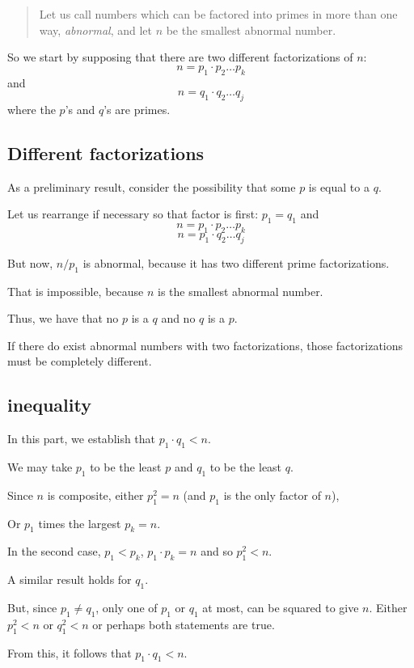 \documentclass[11pt, oneside]{article}
\begin{document}
\begin{quote}Let us call numbers which can be factored into primes in more than one way, \emph{abnormal}, and let $n$ be the smallest abnormal number.\end{quote}

So we start by supposing that there are two different factorizations of $n$:
\[ n = p_1 \cdot p_2 \dots p_k \]
and
\[ n = q_1 \cdot q_2 \dots q_j \]
where the $p$'s and $q$'s are primes.

\subsection*{Different factorizations}

As a preliminary result, consider the possibility that some $p$ is equal to a $q$.

Let us rearrange if necessary so that factor is first:  $p_1 = q_1$ and
\[ n = p_1 \cdot p_2 \dots p_k \]
\[ n = p_1 \cdot q_2 \dots q_j \]

But now, $n/p_1$ is abnormal, because it has two different prime factorizations.  

That is impossible, because $n$ is the smallest abnormal number.

Thus, we have that no $p$ is a $q$ and no $q$ is a $p$.

If there do exist abnormal numbers with two factorizations, those factorizations must be completely different.

\subsection*{inequality}

In this part, we establish that $p_1 \cdot q_1 < n$.

We may take $p_1$ to be the least $p$ and $q_1$ to be the least $q$.  

Since $n$ is composite, either $p_1^2 = n$ (and $p_1$ is the only factor of $n$),

Or $p_1$ times the largest $p_k = n$.

In the second case, $p_1 < p_k$, $p_1 \cdot p_k = n$ and so $p_1^2 < n$.

A similar result holds for $q_1$.

But, since $p_1 \ne q_1$, only one of $p_1$ or $q_1$ at most, can be squared to give $n$.  Either $p_1^2 < n$ or $q_1^2 < n$ or perhaps both statements are true.

From this, it follows that $p_1 \cdot q_1 < n$. 
\end{document}
